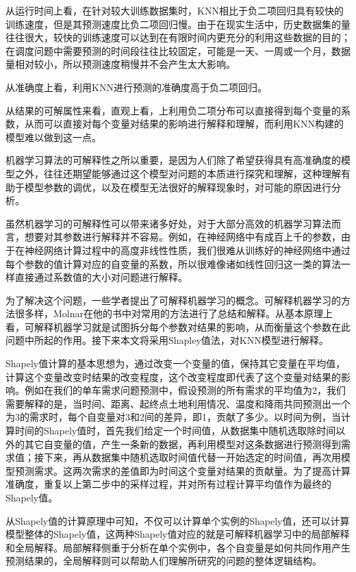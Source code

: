 \documentclass[]{tongjithesis}
\numberwithin{equation}{chapter}
\begin{document}
从运行时间上看，在针对较大训练数据集时，KNN相比于负二项回归具有较快的训练速度，但是其预测速度比负二项回归慢。由于在现实生活中，历史数据集的量往往很大，较快的训练速度可以达到在有限时间内更充分的利用这些数据的目的；在调度问题中需要预测的时间段往往比较固定，可能是一天、一周或一个月，数据量相对较小，所以预测速度稍慢并不会产生太大影响。

从准确度上看，利用KNN进行预测的准确度高于负二项回归。

从结果的可解属性来看，直观上看，上利用负二项分布可以直接得到每个变量的系数，从而可以直接对每个变量对结果的影响进行解释和理解，而利用KNN构建的模型难以做到这一点。

机器学习算法的可解释性之所以重要，是因为人们除了希望获得具有高准确度的模型之外，往往还期望能够通过这个模型对问题的本质进行探究和理解，这种理解有助于模型参数的调优，以及在模型无法很好的解释现象时，对可能的原因进行分析。

虽然机器学习的可解释性可以带来诸多好处，对于大部分高效的机器学习算法而言，想要对其参数进行解释并不容易。例如，在神经网络中有成百上千的参数，由于在神经网络计算过程中的高度非线性性质，我们很难从训练好的神经网络中通过每个参数的值计算对应的自变量的系数，所以很难像诸如线性回归这一类的算法一样直接通过系数值的大小对问题进行解释。

为了解决这个问题，一些学者提出了可解释机器学习的概念。可解释机器学习的方法很多样，Molnar在他的书中对常用的方法进行了总结和解释\cite{molnar2019}。从基本原理上看，可解释机器学习就是试图拆分每个参数对结果的影响，从而衡量这个参数在此问题中所起的作用。接下来本文将采用Shapley值法，对KNN模型进行解释。

Shapely值计算的基本思想为，通过改变一个变量的值，保持其它变量在平均值，计算这个变量改变时结果的改变程度，这个改变程度即代表了这个变量对结果的影响。例如在我们的单车需求问题预测中，假设预测的所有需求的平均值为2，我们需要解释的是，当时间、距离、起终点土地利用情况、温度和降雨共同预测出一个为3的需求时，每个自变量对3和2间的差异，即1，贡献了多少。以时间为例，当计算时间的Shapely值时，首先我们给定一个时间值，从数据集中随机选取除时间以外的其它自变量的值，产生一条新的数据，再利用模型对这条数据进行预测得到需求值；接下来，再从数据集中随机选取时间值代替一开始选定的时间值，再次用模型预测需求。这两次需求的差值即为时间这个变量对结果的贡献量。为了提高计算准确度，重复以上第二步中的采样过程，并对所有过程计算平均值作为最终的Shapely值。

从Shapely值的计算原理中可知，不仅可以计算单个实例的Shapely值，还可以计算模型整体的Shapely值，这两种Shapely值对应的就是可解释机器学习中的局部解释和全局解释。局部解释侧重于分析在单个实例中，各个自变量是如何共同作用产生预测结果的，全局解释则可以帮助人们理解所研究的问题的整体逻辑结构。
\end{document}
